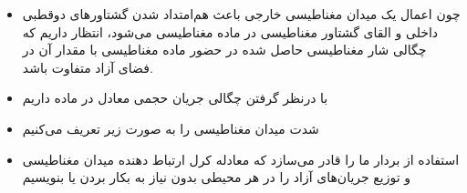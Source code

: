 \ELhold


\begin{ELunit}


\end{ELunit}

\ELhold


\begin{ELunit}

\begin{itemize}
\tightlist
\item
  چون اعمال یک میدان مغناطیسی خارجی باعث هم‌امتداد شدن گشتاورهای دوقطبی داخلی و القای گشتاور مغناطیسی در ماده مغناطیسی می‌شود، انتظار داریم که چگالی شار مغناطیسی حاصل شده در حضور ماده مغناطیسی با مقدار آن در فضای آزاد متفاوت باشد.
\item
  با درنظر گرفتن چگالی جریان حجمی معادل در ماده داریم
\end{itemize}


\end{ELunit}

\begin{ELjoin}

\begin{itemize}
\tightlist
\item
  شدت میدان مغناطیسی را به صورت زیر تعریف می‌کنیم
\end{itemize}

\begin{ELimportant}{}


\end{ELimportant}

\end{ELjoin}

\begin{ELunit}

\begin{itemize}
\tightlist
\item
  استفاده از بردار  ما را قادر می‌سازد که معادله کرل ارتباط دهنده میدان مغناطیسی و توزیع جریان‌های آزاد را در هر محیطی بدون نیاز به بکار بردن  یا  بنویسیم
\end{itemize}

\end{ELunit}

